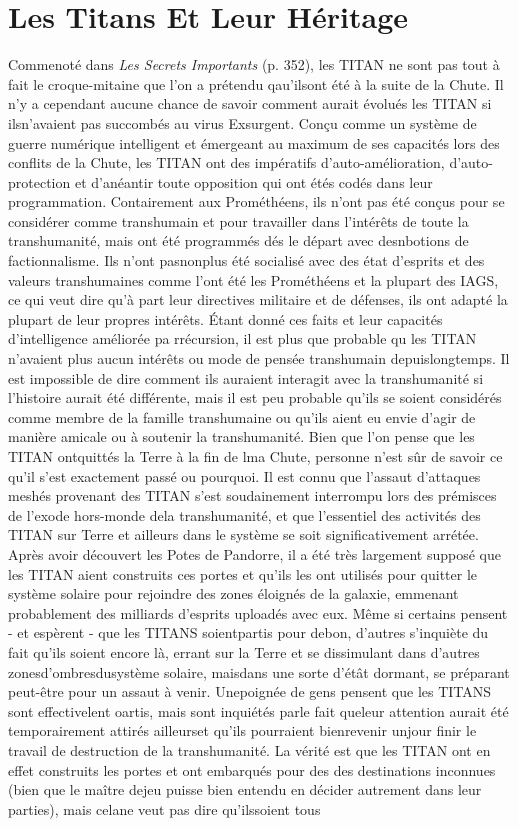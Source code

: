 {\section{Les Titans Et Leur Héritage} 

Commenoté dans \textit{Les Secrets Importants} (p. 352), les TITAN ne sont pas tout à fait le croque-mitaine que l'on a prétendu qau'ilsont été à la suite de la Chute. Il n'y a cependant aucune chance de savoir comment aurait évolués les TITAN si ilsn'avaient pas succombés au virus Exsurgent. Conçu comme un système de guerre numérique intelligent et émergeant au maximum de ses capacités lors des conflits de la Chute, les TITAN ont des impératifs d'auto-amélioration, d'auto-protection et d'anéantir toute opposition qui ont étés codés dans leur programmation. Contairement aux Prométhéens, ils n'ont pas été conçus pour se considérer comme transhumain et pour travailler dans l'intérêts de toute la transhumanité, mais ont été programmés dés le départ avec desnbotions de factionnalisme. Ils n'ont pasnonplus été socialisé avec des état d'esprits et des valeurs transhumaines comme l'ont été les Prométhéens et la  plupart des IAGS, ce qui veut dire qu'à part leur directives militaire et de défenses, ils ont adapté la plupart de leur propres intérêts. Étant donné ces faits et leur capacités d'intelligence améliorée pa rrécursion, il est plus que probable qu les TITAN n'avaient plus aucun intérêts ou mode de pensée transhumain depuislongtemps. Il est impossible de dire comment ils auraient interagit avec la transhumanité si l'histoire aurait été différente, mais il est peu probable qu'ils se soient considérés comme membre de la famille transhumaine ou qu'ils aient eu envie d'agir de manière amicale ou à soutenir la transhumanité. Bien que l'on pense que les TITAN ontquittés la Terre à la fin de lma Chute, personne n'est sûr de savoir ce qu'il s'est exactement passé ou pourquoi. Il est connu que l'assaut d'attaques meshés provenant des TITAN s'est soudainement interrompu lors des prémisces de l'exode hors-monde dela transhumanité, et que l'essentiel des activités des TITAN sur Terre et ailleurs dans le système se soit significativement arrétée. Après avoir découvert les Potes de Pandorre, il a été très largement supposé que les TITAN aient construits ces portes et qu'ils les ont utilisés pour quitter le système solaire pour rejoindre des zones éloignés de la galaxie, emmenant probablement des milliards d'esprits uploadés avec eux. Même si certains pensent - et espèrent - que les TITANS soientpartis pour debon, d'autres s'inquiète du fait qu'ils soient encore là, errant sur la Terre et se dissimulant dans d'autres zonesd'ombresdusystème solaire, maisdans une sorte d'étât dormant, se préparant peut-être pour un assaut à venir. Unepoignée de gens pensent que les TITANS sont effectivelent oartis, mais sont inquiétés parle fait queleur attention aurait été temporairement attirés ailleurset qu'ils pourraient bienrevenir unjour finir le travail de destruction de la transhumanité. La vérité est que les TITAN ont en effet construits les portes et ont embarqués pour des des destinations inconnues (bien que le maître dejeu puisse bien entendu en  décider autrement dans leur parties), mais celane veut pas dire qu'ilssoient tous }
